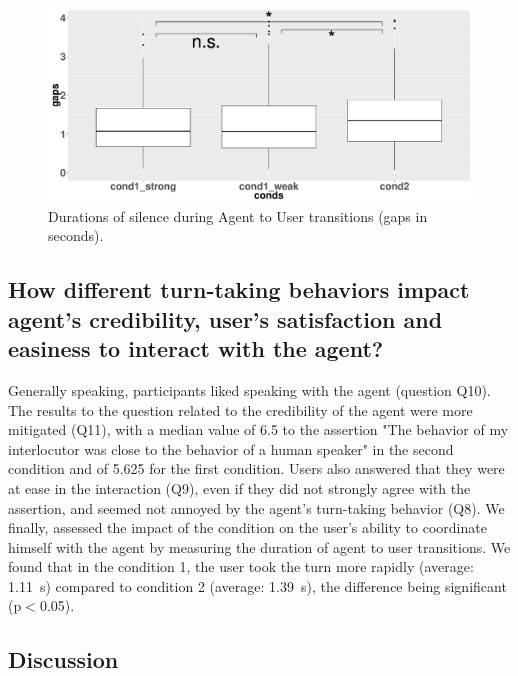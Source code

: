 \begin{figure}
\centering
\includegraphics[width=\linewidth]{figure/boxTransitionsAU.pdf}
\caption{Durations of silence during Agent to User transitions (gaps in seconds).}
\label{box_au}
\end{figure}

\subsection{How different turn-taking behaviors impact agent's credibility,  user's satisfaction and easiness to interact with the agent?}

Generally speaking, participants liked speaking with the agent (question Q10). The results to the question related to the credibility of the agent were more mitigated (Q11), with a median value of 6.5 to the assertion "The behavior of my interlocutor was close to the behavior of a human speaker" in the second condition and of 5.625 for the first condition. Users also answered that they were at ease in the interaction (Q9), even if they did not strongly agree with the assertion, and seemed not annoyed by the agent's turn-taking behavior (Q8). 
We finally, assessed the impact of the condition on the user's ability to coordinate himself with the agent by measuring the duration of agent to user transitions. We found that in the condition 1, the user took the turn more rapidly (average: 1.11~s) compared to condition 2 (average: 1.39~s), the difference being significant (p$<$0.05). 


\subsection{Discussion}


